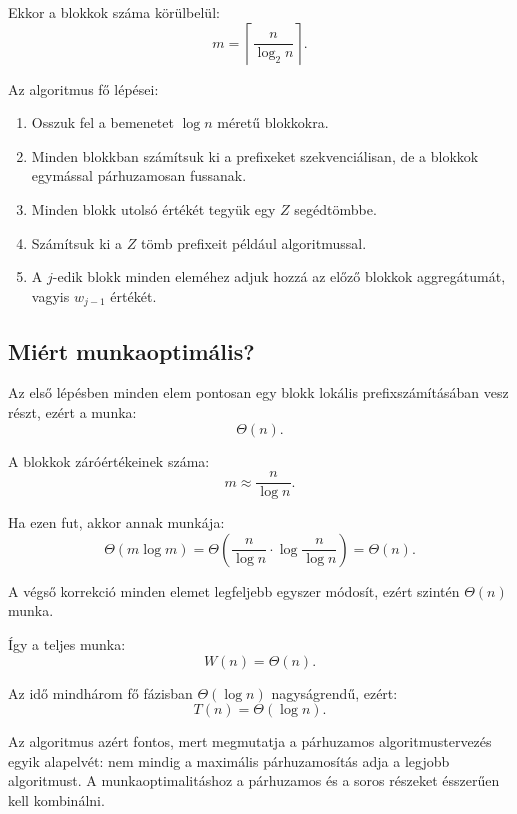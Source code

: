 Ekkor a blokkok száma körülbelül:
\[
  m=\left\lceil\frac{n}{\log_2 n}\right\rceil.
\]

Az algoritmus fő lépései:

\begin{enumerate}
  \item Osszuk fel a bemenetet $\log n$ méretű blokkokra.
  \item Minden blokkban számítsuk ki a prefixeket szekvenciálisan, de a blokkok egymással párhuzamosan fussanak.
  \item Minden blokk utolsó értékét tegyük egy $Z$ segédtömbbe.
  \item Számítsuk ki a $Z$ tömb prefixeit például  algoritmussal.
  \item A $j$-edik blokk minden eleméhez adjuk hozzá az előző blokkok aggregátumát, vagyis $w_{j-1}$ értékét.
\end{enumerate}




\subsection{Miért munkaoptimális?}

Az első lépésben minden elem pontosan egy blokk lokális prefixszámításában vesz részt, ezért a munka:
\[
  \Theta(n).
\]

A blokkok záróértékeinek száma:
\[
  m\approx\frac{n}{\log n}.
\]

Ha ezen  fut, akkor annak munkája:
\[
  \Theta(m\log m)
  =\Theta\left(\frac{n}{\log n}\cdot\log\frac{n}{\log n}\right)
  =\Theta(n).
\]

A végső korrekció minden elemet legfeljebb egyszer módosít, ezért szintén $\Theta(n)$ munka.

Így a teljes munka:
\[
  W(n)=\Theta(n).
\]

Az idő mindhárom fő fázisban $\Theta(\log n)$ nagyságrendű, ezért:
\[
  T(n)=\Theta(\log n).
\]

\begin{summarybox}
Az  algoritmus azért fontos, mert megmutatja a párhuzamos algoritmustervezés egyik alapelvét: nem mindig a maximális párhuzamosítás adja a legjobb algoritmust. A munkaoptimalitáshoz a párhuzamos és a soros részeket ésszerűen kell kombinálni.
\end{summarybox}

